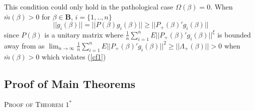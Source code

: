 \documentclass[11pt, fleqn]{article}
\begin{document}
This condition could only hold in the pathological case  $\Omega(\beta)=0$. When $\bar{m}(\beta)>0$ for 
 $\beta\in \mathbf{B}$, $i=\{1,..,n\}$\begin{equation}\label{bound} |\!|g_i(\beta)|\!|=|\!|P(\beta)g_i(\beta)|\!|\geq |\!|P_+(\beta)'g_i(\beta)|\!| \end{equation}
since $P(\beta)$ is a unitary matrix 
where $\frac{1}{n}\sum_{i=1}^n E|\!|P_+(\beta)'g_i(\beta)|\!|^{\xi}$ is bounded away from as 
    $\lim_{n\rightarrow \infty}\frac{1}{n}\sum_{i=1}^nE|\!|P_+(\beta)'g_i(\beta)|\!|^2 \geq |\!|\Lambda_+(\beta)|\!|>0$   when $\bar{m}(\beta)>0$ which violates (\ref{cf1})




\subsection{ Proof of Main Theorems}
\textsc{Proof of Theorem $1^*$}
\end{document}
